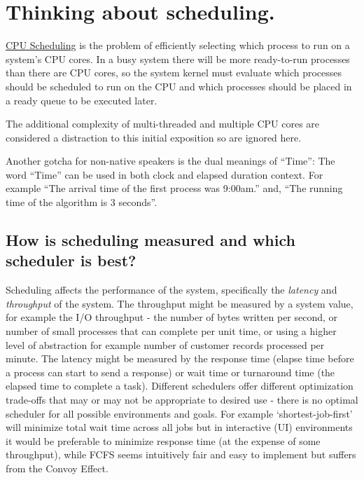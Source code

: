 \section{Thinking about scheduling.}\label{thinking-about-scheduling.}

\href{https://en.wikipedia.org/wiki/Scheduling_(computing)}{CPU
Scheduling} is the problem of efficiently selecting which process to run
on a system's CPU cores. In a busy system there will be more
ready-to-run processes than there are CPU cores, so the system kernel
must evaluate which processes should be scheduled to run on the CPU and
which processes should be placed in a ready queue to be executed later.

The additional complexity of multi-threaded and multiple CPU cores are
considered a distraction to this initial exposition so are ignored here.

Another gotcha for non-native speakers is the dual meanings of ``Time'':
The word ``Time'' can be used in both clock and elapsed duration
context. For example ``The arrival time of the first process was
9:00am.'' and, ``The running time of the algorithm is 3 seconds''.

\subsection{How is scheduling measured and which scheduler is
best?}\label{how-is-scheduling-measured-and-which-scheduler-is-best}

Scheduling affects the performance of the system, specifically the
\emph{latency} and \emph{throughput} of the system. The throughput might
be measured by a system value, for example the I/O throughput - the
number of bytes written per second, or number of small processes that
can complete per unit time, or using a higher level of abstraction for
example number of customer records processed per minute. The latency
might be measured by the response time (elapse time before a process can
start to send a response) or wait time or turnaround time (the elapsed
time to complete a task). Different schedulers offer different
optimization trade-offs that may or may not be appropriate to desired
use - there is no optimal scheduler for all possible environments and
goals. For example `shortest-job-first' will minimize total wait time
across all jobs but in interactive (UI) environments it would be
preferable to minimize response time (at the expense of some
throughput), while FCFS seems intuitively fair and easy to implement but
suffers from the Convoy Effect.

